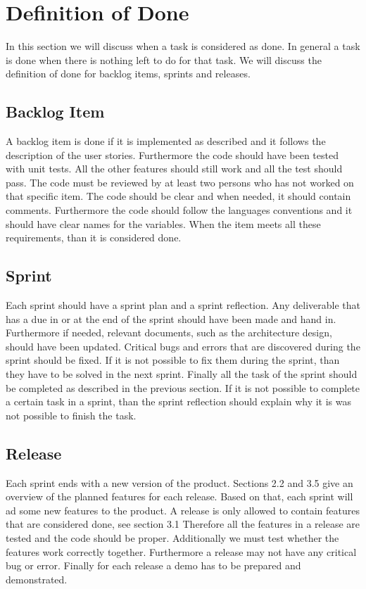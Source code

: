 \section{Definition of Done}
In this section we will discuss when a task is considered as done. In general a task is done when there is nothing left to do for that task. We will discuss the definition of done for backlog items, sprints and releases.

\subsection{Backlog Item}
A backlog item is done if it is implemented as described and it follows the description of the user stories. Furthermore the code should have been tested with unit tests. All the other features should still work and all the test should pass. The code must be reviewed by at least two persons who has not worked on that specific item. The code should be clear and when needed, it should contain comments. Furthermore the code should follow the languages conventions and it should have clear names for the variables. When the item meets all these requirements, than it is considered done.

\subsection{Sprint}
Each sprint should have a sprint plan and a sprint reflection. Any deliverable that has a due in or at the end of the sprint should have been made and hand in. Furthermore  if needed, relevant documents, such as the architecture design, should have been updated. Critical bugs and errors that are discovered during the sprint should be fixed. If it is not possible to fix them during the sprint, than they have to be solved in the next sprint. Finally all the task of the sprint should be completed as described in the previous section. If it is not possible to complete a certain task in a sprint, than the sprint reflection should explain why it is was not possible to finish the task.

\subsection{Release}
Each sprint ends with a new version of the product. Sections 2.2 and 3.5 give an overview of the planned features for each release. Based on that, each sprint will ad some new features to the product.
A release is only allowed to contain features that are considered done, see section 3.1 Therefore all the features in a release are tested and the code should be proper. Additionally we must test whether the features work correctly together. Furthermore a release may not have any critical bug or error. Finally for each release a demo has to be prepared and demonstrated. 
